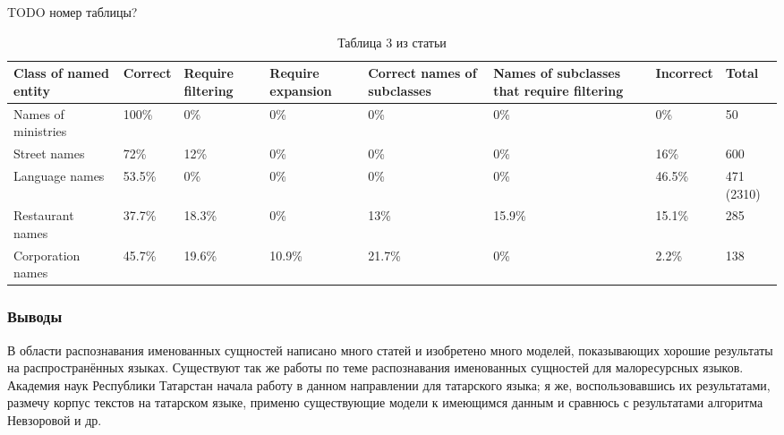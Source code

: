 TODO номер таблицы?

\begin{table}[h!]
 \begin{tabular}[h]{m{2.2cm}m{1.7cm}m{1.7cm}m{1.8cm}m{1.9cm}m{1.9cm}m{1.7cm}m{1.7cm}}

\hline
\hline
Class of named entity  & Correct & Require filtering & Require expansion & Correct names of subclasses & Names of subclasses that require filtering & Incorrect & Total \\
\hline
 Names of ministries & 100\% & 0\% & 0\% & 0\% & 0\% & 0\% & 50 \\
 \hline
 Street names & 72\% & 12\% & 0\% & 0\% & 0\% & 16\% & 600 \\
 \hline
 Language names & 53.5\% & 0\% & 0\% & 0\% & 0\% & 46.5\% & 471 (2310) \\
 \hline
 Restaurant names & 37.7\% & 18.3\% & 0\% & 13\% & 15.9\% & 15.1\% & 285 \\
 \hline
 Corporation names & 45.7\% & 19.6\% & 10.9\% & 21.7\% & 0\% & 2.2\% & 138 \\
\hline
\hline
\end{tabular}
\caption{Таблица 3 из статьи \cite{Nevzorova}}
\label{table:Nevzorova}
\end{table}

\subsubsection{Выводы}

В области распознавания именованных сущностей написано много статей и изобретено много моделей, показывающих хорошие результаты на распространённых языках. Существуют так же работы по теме распознавания именованных сущностей для малоресурсных языков. Академия наук Республики Татарстан начала работу в данном направлении для татарского языка; я же, воспользовавшись их результатами, размечу корпус текстов на татарском языке, применю существующие модели к имеющимся данным и сравнюсь с результатами алгоритма Невзоровой и др.



























